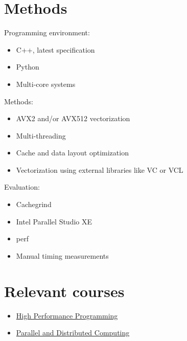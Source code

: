 \documentclass[12pt]{article}
\begin{document}
	\section{Methods}
	
	Programming environment:
	\begin{itemize}
		\item C++, latest specification
		\item Python
		\item Multi-core systems
	\end{itemize}

	Methods:
	\begin{itemize}
		\item AVX2 and/or AVX512 vectorization
		\item Multi-threading
		\item Cache and data layout optimization
		\item Vectorization using external libraries like VC or VCL
	\end{itemize}

	Evaluation:
	\begin{itemize}
		\item Cachegrind
		\item Intel Parallel Studio XE
		\item perf
		\item Manual timing measurements
	\end{itemize}



	\newpage
	\section{Relevant courses}
	
	\begin{itemize}
		\item \href{http://www.uu.se/en/admissions/master/selma/kursplan/?kpid=31897&lasar=18%2F19&typ=1}
			{High Performance Programming}	
		
		\item \href{http://www.uu.se/en/admissions/master/selma/kursplan/?kpid=31898&type=1}
			{Parallel and Distributed Computing}
	\end{itemize}
\end{document}

